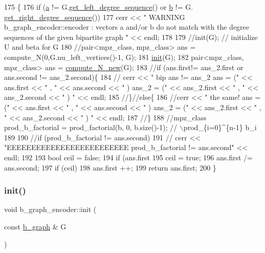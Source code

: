 \begin{DoxyCode}
175 \{
176   \textcolor{keywordflow}{if} (\hyperlink{classb__graph__encoder_afd22d167f495cd85b41397f337c377c2}{a} != G.\hyperlink{classb__graph_afd65fb655f7e24217393a10533b87d3c}{get\_left\_degree\_sequence}() or \hyperlink{classb__graph__encoder_a767826e268702e45ab71565e096a52b8}{b} != G.
      \hyperlink{classb__graph_a2711566385b92b02f4c03abdc1f9a582}{get\_right\_degree\_sequence}())
177     cerr << \textcolor{stringliteral}{" WARNING b\_graph\_encoder::encoder : vectors a and/or b do not match with the degree sequences
       of the given bipartite graph  "} << endl;
178 
179   \textcolor{comment}{//init(G); // initialize U and beta for G}
180   \textcolor{comment}{//pair<mpz\_class, mpz\_class> ans = compute\_N(0,G.nu\_left\_vertices()-1, G);}
181   \hyperlink{classb__graph__encoder_a9b62ac0580191ac42b98d764046af7cb}{init}(G);
182   pair<mpz\_class, mpz\_class> ans = \hyperlink{classb__graph__encoder_abb9153c776f8c9ec9aeb6361080e84d4}{compute\_N\_new}(G);
183   \textcolor{comment}{//if (ans.first!= ans\_2.first or ans.second != ans\_2.second)\{}
184   \textcolor{comment}{//  cerr << " bip ans != ans\_2 ans = (" << ans.first << " , " << ans.second <<  " ) ans\_2 = (" <<
       ans\_2.first << " , " << ans\_2.second << " ) "  << endl;}
185   \textcolor{comment}{//\}//else\{}
186   \textcolor{comment}{//cerr << " the same! ans = (" << ans.first << " , " << ans.second <<  " ) ans\_2 = (" << ans\_2.first << "
       , " << ans\_2.second << " ) "  << endl;}
187   \textcolor{comment}{//\}}
188   \textcolor{comment}{//mpz\_class prod\_b\_factorial = prod\_factorial(b, 0, b.size()-1); // \(\backslash\)prod\_\{i=0\}^\{n-1\} b\_i}
189 
190   \textcolor{comment}{//if (prod\_b\_factorial != ans.second)}
191   \textcolor{comment}{//  cerr << "EEEEEEEEEEEEEEEEEEEEEEEEE prod\_b\_factorial != ans.second" << endl;}
192 
193   \textcolor{keywordtype}{bool} ceil = \textcolor{keyword}{false};
194   \textcolor{keywordflow}{if} (ans.first %
195     ceil = \textcolor{keyword}{true};
196   ans.first /= ans.second;
197   \textcolor{keywordflow}{if} (ceil)
198     ans.first ++;
199   \textcolor{keywordflow}{return} ans.first;
200 \}
\end{DoxyCode}
\mbox{\label{classb__graph__encoder_a9b62ac0580191ac42b98d764046af7cb}} 
\subsubsection{\texorpdfstring{init()}{init()}}
{\footnotesize\ttfamily void b\+\_\+graph\+\_\+encoder\+::init (\begin{DoxyParamCaption}\item[{const \hyperlink{classb__graph}{b\+\_\+graph} \&}]{G }\end{DoxyParamCaption})}



